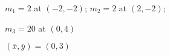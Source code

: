 {$m_1=2$  at $(-2,-2)$; \quad $m_2=2$  at $(2,-2)$;\par $m_3=20$  at $(0,4)$
}
{$(\overline{x},\overline{y}) = (0,3)$
}